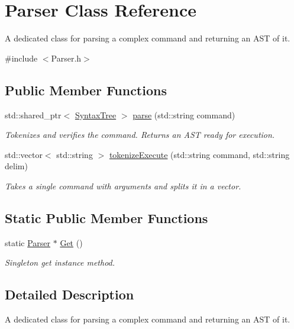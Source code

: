 \hypertarget{classParser}{}\section{Parser Class Reference}
\label{classParser}


A dedicated class for parsing a complex command and returning an A\+ST of it.  




{\ttfamily \#include $<$Parser.\+h$>$}

\subsection*{Public Member Functions}
\begin{DoxyCompactItemize}
\item 
std\+::shared\+\_\+ptr$<$ \hyperlink{structSyntaxTree}{Syntax\+Tree} $>$ \hyperlink{classParser_a32949d94e4a2306e1b6bd7f9c8576a39}{parse} (std\+::string command)
\begin{DoxyCompactList}\small\item\em Tokenizes and verifies the command. Returns an A\+ST ready for execution. \end{DoxyCompactList}\item 
std\+::vector$<$ std\+::string $>$ \hyperlink{classParser_a21451cb3011d796acf866b05d52601f3}{tokenize\+Execute} (std\+::string command, std\+::string delim)
\begin{DoxyCompactList}\small\item\em Takes a single command with arguments and splits it in a vector. \end{DoxyCompactList}\end{DoxyCompactItemize}
\subsection*{Static Public Member Functions}
\begin{DoxyCompactItemize}
\item 
static \hyperlink{classParser}{Parser} $\ast$ \hyperlink{classParser_a6177e907d92d35de545d44d10a23bc07}{Get} ()
\begin{DoxyCompactList}\small\item\em Singleton get instance method. \end{DoxyCompactList}\end{DoxyCompactItemize}


\subsection{Detailed Description}
A dedicated class for parsing a complex command and returning an A\+ST of it. 

